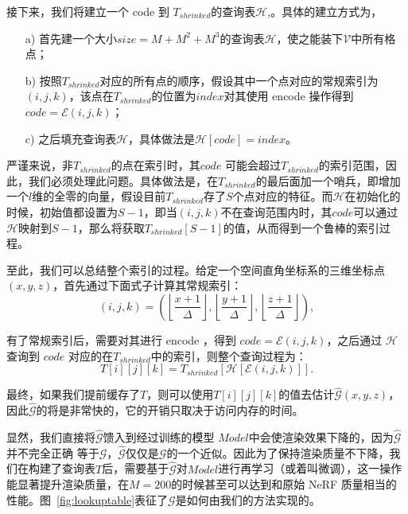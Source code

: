 接下来，我们将建立一个 code 到 $T_{shrinked}$的查询表$\mathcal{H}$,。具体的建立方式为，
\begin{enumerate}
    \item[a)] 首先建一个大小$size = M + M^2 + M^3$的查询表$\mathcal{H}$，使之能装下$\mathcal{V}$中所有格点；
    \item[b)] 按照$T_{shrinked}$对应的所有点的顺序，假设其中一个点对应的常规索引为$\left(i, j, k\right)$，该点在$T_{shrinked}$的位置为$index$对其使用 encode 操作得到$code = \mathcal{E}\left(i, j, k\right)$；
    \item[c)] 之后填充查询表$\mathcal{H}$，具体做法是$\mathcal{H}[code] = index$。
\end{enumerate}
严谨来说，非$T_{shrinked}$的点在索引时，其$code$ 可能会超过$T_{shrinked}$的索引范围，因此，我们必须处理此问题。具体做法是，在$T_{shrinked}$的最后面加一个哨兵，即增加一个$l$维的全零的向量，假设目前$T_{shrinked}$存了$S$个点对应的特征。而$\mathcal{H}$在初始化的时候，初始值都设置为$S-1$，即当$\left(i, j, k\right)$不在查询范围内时，其$code$可以通过$\mathcal{H}$映射到$S-1$，那么将获取$T_{shrinked}\left[S-1\right]$的值，从而得到一个鲁棒的索引过程。

至此，我们可以总结整个索引的过程。给定一个空间直角坐标系的三维坐标点$\left(x, y, z\right)$，首先通过下面式子计算其常规索引：
\begin{equation}
    \left(i, j, k\right) = \left(\left \lfloor \frac{x + 1}{\Delta} \right \rfloor, \left \lfloor \frac{y + 1}{\Delta} \right \rfloor, \left \lfloor \frac{z + 1}{\Delta} \right \rfloor\right),
\end{equation}

有了常规索引后，需要对其进行 encode ，得到 $code = \mathcal{E}\left(i, j, k\right)$，之后通过 $\mathcal{H}$ 查询到 $code$ 对应的在$T_{shrinked}$中的索引，则整个查询过程为：
\begin{equation}
    T\left[i \right]\left[j \right]\left[k \right] = T_{shrinked} \left[\mathcal{H}\left[\mathcal{E}\left(i, j, k\right) \right] \right].
\end{equation}

最终，如果我们提前缓存了$T$，则可以使用$T\left[i \right]\left[j \right]\left[k \right]$的值去估计$\hat{\mathcal{G}}\left(x, y, z\right)$，因此$\hat{\mathcal{G}}$的将是非常快的，它的开销只取决于访问内存的时间。

显然，我们直接将$\hat{\mathcal{G}}$馈入到经过训练的模型 $Model$中会使渲染效果下降的，因为$\hat{\mathcal{G}}$并不完全正确
等于$\mathcal{G}$，$\hat{\mathcal{G}}$仅仅是$\mathcal{G}$的一个近似。因此为了保持渲染质量不下降，我们在构建了查询表$T$后，需要基于$\hat{\mathcal{G}}$对$Model$进行再学习（或着叫微调），这一操作能显著提升渲染质量，在$M = 200$的时候甚至可以达到和原始 NeRF 质量相当的性能。图~\ref{fig:lookuptable}表征了$\mathcal{G}$是如何由我们的方法实现的。

